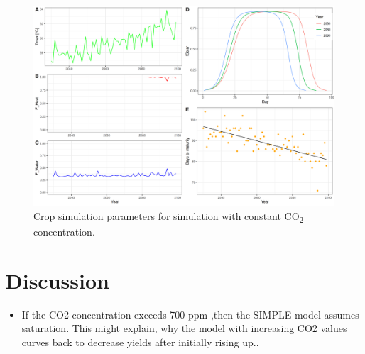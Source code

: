 \documentclass[11pt]{article}
\begin{document}
\begin{figure}[htbp]
\centering
\includegraphics[width=1\textwidth]{../results/cc-model/paras_sim.png}
\caption{Crop simulation parameters for simulation with constant CO\textsubscript{2} concentration.}
\end{figure}

\section{Discussion}
\label{sec:orgd3d8b92}
\begin{itemize}
\item If the CO2 concentration exceeds 700 ppm ,then the SIMPLE model assumes saturation. This might explain, why the model with increasing CO2 values curves back to decrease yields after initially rising up..
\end{itemize}
\end{document}
